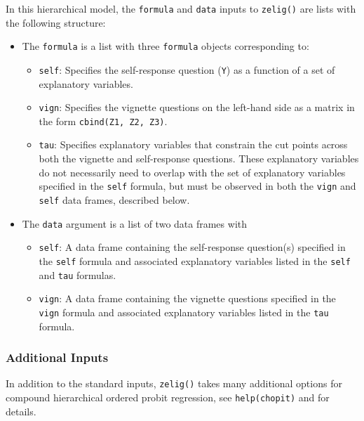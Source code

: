 In this hierarchical model, the {\tt formula} and {\tt data} inputs to
{\tt zelig()} are lists with the following structure:  
\begin{itemize}
\item The {\tt formula} is a list with three {\tt formula} objects
corresponding to:  
\begin{itemize}
\item {\tt self}:  Specifies the self-response question ({\tt Y}) as a function
of a set of explanatory variables. 
\item {\tt vign}:  Specifies the vignette questions on the left-hand
side as a matrix in the form {\tt cbind(Z1, Z2, Z3)}.  
\item {\tt tau}:  Specifies explanatory variables that constrain the cut points
across both the vignette and self-response questions.  These
explanatory variables do not necessarily need to overlap with the set
of explanatory variables specified in the {\tt self} formula, but must
be observed in both the {\tt vign} and {\tt self} data frames,
described below. 
\end{itemize}
\item The {\tt data} argument is a list of two data frames with
\begin{itemize}
\item {\tt self}:  A data frame containing the self-response
question(s) specified in the {\tt self} formula and associated
explanatory variables listed in the {\tt self} and {\tt tau} formulas.
\item {\tt vign}:  A data frame containing the vignette questions
specified in the {\tt vign} formula and associated explanatory
variables listed in the {\tt tau} formula.
\end{itemize}
\end{itemize}  

\subsubsection{Additional Inputs} 

In addition to the standard inputs, {\tt zelig()} takes many
additional options for compound hierarchical ordered probit
regression, see {\tt help(chopit)} and \cite{WanKinLau07} for details.

